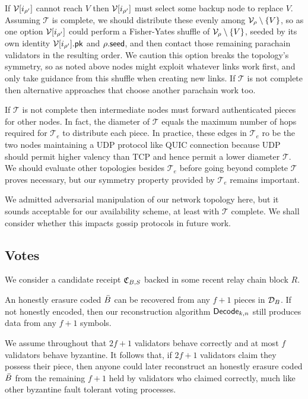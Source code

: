 If $\mathcal{V}[i_{\rho'}]$ cannot reach $V$ then $\mathcal{V}[i_{\rho'}]$ must select some backup node to replace $V$.  Assuming $\mathcal{T}$ is complete, we should distribute these evenly among $\mathcal{V}_{\rho} \setminus \{V\}$, so as one option $\mathcal{V}[i_{\rho'}]$ could perform a Fisher-Yates shuffle of $\mathcal{V}_{\rho} \setminus \{V\}$, seeded by its own identity $\mathcal{V}[i_{\rho'}].\mathsf{pk}$ and $\rho.\mathsf{seed}$, and then contact those remaining parachain validators in the resulting order.  We caution this option breaks the topology's symmetry, so as noted above nodes might exploit whatever links work first, and only take guidance from this shuffle when creating new links.  If $\mathcal{T}$ is not complete then alternative approaches that choose another parachain work too.  

If $\mathcal{T}$ is not complete then intermediate nodes must forward authenticated pieces for other nodes.  In fact, the diameter of $\mathcal{T}$ equals the maximum number of hops required for $\mathcal{T}_e$ to distribute each piece.  
In practice, these edges in $\mathcal{T}_e$ ro be the two nodes
maintaining a UDP protocol like QUIC connection because UDP should permit higher valency than TCP and hence permit a lower diameter $\mathcal{T}$.  
We should evaluate other topologies besides $\mathcal{T}_e$ before going beyond complete $\mathcal{T}$ proves necessary, but our symmetry property provided by $\mathcal{T}_e$ remains important. 

We admitted adversarial manipulation of our network topology here, but it sounds acceptable for our availability scheme, at least with $\mathcal{T}$ complete.  We shall consider whether this impacts gossip protocols in future work. 


\subsection{Votes} %
\label{sec:availability_votes}  %

We consider a candidate receipt $\mathfrak{C}_{B,S}$ backed in some recent relay chain block $R$.  

An honestly erasure coded $\bar{B}$ can be recovered from any $f+1$ pieces in $\mathcal{D}_B$.  If not honestly encoded, then our reconstruction algorithm $\mathsf{Decode}_{k,n}$  still produces data from any $f+1$ symbols.

We assume throughout that $2f+1$ validators behave correctly and at most $f$ validators behave byzantine.  
It follows that, if $2f+1$ validators claim they possess their piece, then anyone could later reconstruct an honestly erasure coded $\bar{B}$ from the remaining $f+1$ held by validators who claimed correctly, much like other byzantine fault tolerant voting processes.  

